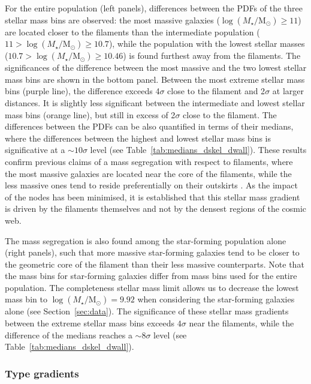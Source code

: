 \documentclass[useAMS,usenatbib]{mnras}
\newcommand{\Mstardot}{M\ensuremath{_{\star}} / \mathrm{M}\ensuremath{_{\odot}}}
\begin{document}
For the entire population (left panels), differences between the PDFs of the three stellar mass bins are observed: the most massive galaxies ($\log(\Mstardot) \geq 11$) are located closer to the filaments than the intermediate population ($11 > \log(\Mstardot) \geq 10.7$), while the population with the lowest stellar masses ($10.7> \log(\Mstardot) \geq 10.46$) is found furthest away from the filaments. The significances of the difference between the most massive and the two lowest stellar mass bins are shown in the bottom panel.  Between the most extreme stellar mass bins (purple line), the difference exceeds 4$\sigma$ close to the filament and 2$\sigma$ at larger distances. It is slightly less significant 
between the intermediate and lowest stellar mass bins (orange line), but still in excess of 2$\sigma$ close to the filament. 
The differences between the PDFs can be also quantified in terms of their medians, where the differences between the highest and lowest stellar mass bins is significative at a $\sim 10 \sigma$ level (see Table~\ref{tab:medians_dskel_dwall}).
These results confirm previous claims of a mass segregation with respect to filaments, where the most massive galaxies are located near the core of the filaments, while the less massive ones tend to reside preferentially on their outskirts \citep[][]{Malavasi2017,Laigle2017}. 
As the impact of the nodes has been minimised, it is established that this stellar mass gradient is driven by the filaments themselves and not by the densest regions of the cosmic web. 

The mass segregation is also found among the star-forming population alone (right panels),  
such that more massive star-forming galaxies tend to be closer to the geometric core of the filament than their less massive counterparts. 
Note that the mass bins for star-forming galaxies differ from mass bins  used for the entire population. The completeness stellar mass limit allows us to decrease the lowest mass bin to $\log(\Mstardot) = 9.92$ when considering the star-forming galaxies alone (see Section~\ref{sec:data}).
The significance of these stellar mass gradients between the extreme stellar mass bins exceeds $4\sigma$ near the filaments, while the difference of the medians reaches a $\sim 8 \sigma$ level (see Table~\ref{tab:medians_dskel_dwall}). 



\subsubsection{Type gradients}
\label{subsec:grad_type}
\end{document}
